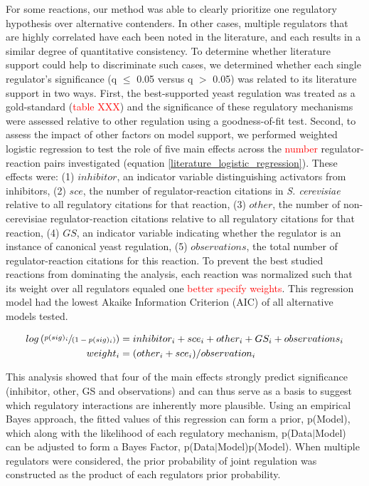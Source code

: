 \documentclass[12pt]{nature}\usepackage{graphicx, color}
\begin{document}
For some reactions, our method was able to clearly prioritize one regulatory hypothesis over alternative contenders.  In other cases, multiple regulators that are highly correlated have each been noted in the literature, and each results in a similar degree of quantitative consistency.  To determine whether literature support could help to discriminate such cases, we determined whether each single regulator's significance (q $\le$ 0.05 versus q $>$ 0.05) was related to its literature support in two ways.  First, the best-supported yeast regulation was treated as a gold-standard (\textcolor{red}{table XXX}) and the significance of these regulatory mechanisms were assessed relative to other regulation using a goodness-of-fit test.  Second, to assess the impact of other factors on model support, we performed weighted logistic regression to test the role of five main effects across the \textcolor{red}{number} regulator-reaction pairs investigated (equation \ref{literature_logistic_regression}).  These effects were: (1) $inhibitor$, an indicator variable distinguishing activators from inhibitors, (2) $sce$, the number of regulator-reaction citations in \textit{S. cerevisiae} relative to all regulatory citations for that reaction, (3) $other$, the number of non-cerevisiae regulator-reaction citations relative to all regulatory citations for that reaction, (4) $GS$, an indicator variable indicating whether the regulator is an instance of canonical yeast regulation, (5) $observations$, the total number of regulator-reaction citations for this reaction.  To prevent the best studied reactions from dominating the analysis, each reaction was normalized such that its weight over all regulators equaled one \textcolor{red}{better specify weights}. This regression model had the lowest Akaike Information Criterion (AIC) of all alternative models tested.

\begin{align}
log\left(\sfrac{p(sig)_{i}}{(1-p(sig)_{i})}\right) &= inhibitor_{i} + sce_{i} + other_{i} + GS_{i} + observations_{i} \notag\\
weight_{i} &= (other_{i} + sce_{i})/observation_{i} \label{literature_logistic_regression}
\end{align}

This analysis showed that four of the main effects strongly predict significance (inhibitor, other, GS and observations) and can thus serve as a basis to suggest which regulatory interactions are inherently more plausible.  Using an empirical Bayes approach, the fitted values of this regression can form a prior, p(Model), which along with the likelihood of each regulatory mechanism, p(Data$|$Model) can be adjusted to  form a Bayes Factor, p(Data$|$Model)p(Model).  When multiple regulators were considered, the prior probability of joint regulation was constructed as the product of each regulators prior probability.
\end{document}
